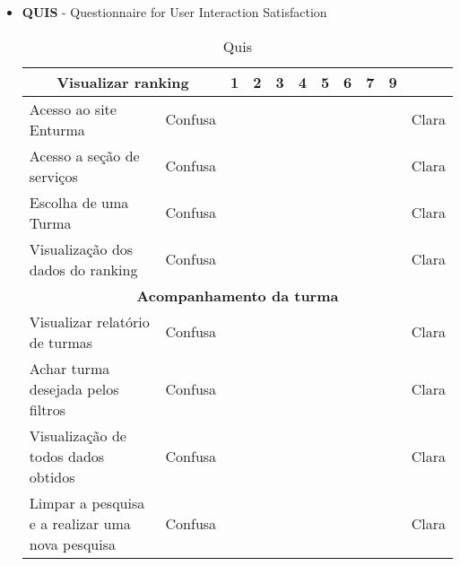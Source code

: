\begin{itemize}
	\item \textbf{QUIS} - Questionnaire for User Interaction Satisfaction
		\begin{table}[H]
			\centering
			\caption{Quis}
			\label{my-label}
			\begin{tabular}{|l|l|l|l|l|l|l|l|l|l|l|}
			\hline
			\multicolumn{2}{|c|}{\textbf{Visualizar ranking}}                                                                                         & 1 & 2 & 3 & 4 & 5 & 6 & 7 & 9 &      \\ \hline Acesso ao site Enturma                                                                                                          & Confusa &   &   &   &   &   &   &   &   & Clara \\ \hline
			Acesso a seção de serviços                                                                                                      & Confusa &   &   &   &   &   &   &   &   & Clara \\ \hline
			Escolha de uma Turma                                                                                                            & Confusa &   &   &   &   &   &   &   &   & Clara \\ \hline
			Visualização dos dados do ranking                                                                                               & Confusa &   &   &   &   &   &   &   &   & Clara \\ \hline
			\multicolumn{11}{|c|}{\textbf{Acompanhamento da turma}}                                                                                                                           \\ \hline
			Visualizar relatório de turmas                                                                                                  & Confusa &   &   &   &   &   &   &   &   & Clara \\ \hline
			Achar turma desejada pelos filtros                                                                                              & Confusa &   &   &   &   &   &   &   &   & Clara \\ \hline
			Visualização de todos dados obtidos                                                                                             & Confusa &   &   &   &   &   &   &   &   & Clara \\ \hline
			Limpar a pesquisa e a realizar uma nova pesquisa                                                                                & Confusa &   &   &   &   &   &   &   &   & Clara \\ \hline

\end{tabular}
\end{table}
\end{itemize}
